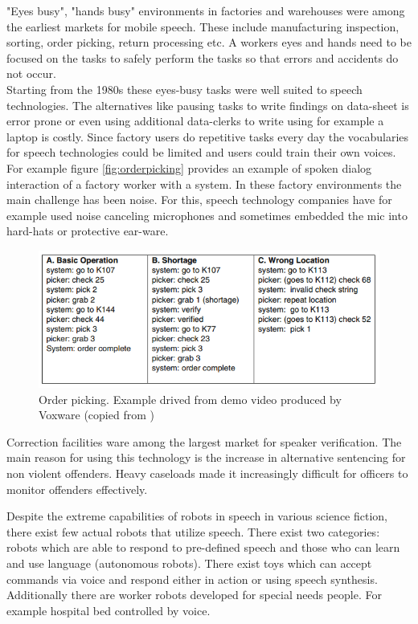 \documentclass[11pt,a4paper,oneside,article]{memoir}
\begin{document}
"Eyes busy", "hands busy" environments in factories and warehouses were among the earliest markets for mobile speech. These include manufacturing inspection, sorting, order picking, return processing etc. A workers eyes and hands need to be focused on the tasks to safely perform the tasks so that errors and accidents do not occur. \\ Starting from the 1980s these eyes-busy tasks were well suited to speech technologies. The alternatives like pausing tasks to write findings on data-sheet is error prone or even using additional data-clerks to write using for example a laptop is costly. Since factory users do repetitive tasks every day the vocabularies for speech technologies could be limited and users could train their own voices. For example figure \vref{fig:orderpicking} provides an example of spoken dialog interaction of a factory worker with a system. In these factory environments the main challenge has been noise. For this, speech technology companies have for example used noise canceling microphones and sometimes embedded the mic into hard-hats or protective ear-ware.\cite{markowitz}

\begin{figure}[h]
  \includegraphics[width=15cm]{orderpicking}
  \caption{Order picking. Example drived from demo video produced by Voxware (copied from \cite{markowitz})}
  \label{fig:orderpicking}
\end{figure}



Correction facilities ware among the largest market for speaker verification. The main reason for using this technology is the increase in alternative sentencing for non violent offenders. Heavy caseloads made it increasingly difficult for officers to monitor offenders effectively.\cite{markowitz}

Despite the extreme capabilities of robots in speech in various science fiction, there exist few actual robots that utilize speech. There exist two categories: robots which are able to respond to pre-defined speech and those who can learn and use language (autonomous robots). There exist toys which can accept commands via voice and respond either in action or using speech synthesis. Additionally there are worker robots developed for special needs people. For example hospital bed controlled by voice. \cite{markowitz}
\end{document}
